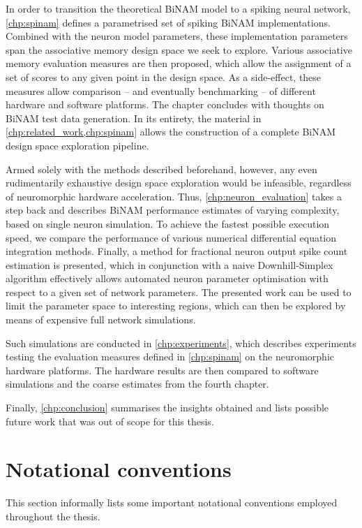 In order to transition the theoretical \acrshort{BiNAM} model to a spiking neural network, \cref{chp:spinam} defines a parametrised set of spiking \acrshort{BiNAM} implementations. Combined with the neuron model parameters, these implementation parameters span the associative memory design space we seek to explore. Various associative memory evaluation measures are then proposed, which allow the assignment of a set of scores to any given point in the design space. As a side-effect, these measures allow comparison -- and eventually benchmarking -- of different hardware and software platforms. The chapter concludes with thoughts on \acrshort{BiNAM} test data generation. In its entirety, the material in \cref{chp:related_work,chp:spinam} allows the construction of a complete \acrshort{BiNAM} design space exploration pipeline.

Armed solely with the methods described beforehand, however, any even rudimentarily exhaustive design space exploration would be infeasible, regardless of neuromorphic hardware acceleration. Thus, \cref{chp:neuron_evaluation} takes a step back and describes \acrshort{BiNAM} performance estimates of varying complexity, based on single neuron simulation. To achieve the fastest possible execution speed, we compare the performance of various numerical differential equation integration methods. Finally, a method for fractional neuron output spike count estimation is presented, which in conjunction with a naive Downhill-Simplex algorithm effectively allows automated neuron parameter optimisation with respect to a given set of network parameters. The presented work can be used to limit the parameter space to interesting regions, which can then be explored by means of expensive full network simulations.

Such simulations are conducted in \cref{chp:experiments}, which describes experiments testing the evaluation measures defined in \cref{chp:spinam} on the neuromorphic hardware platforms. The hardware results are then compared to software simulations and the coarse estimates from the fourth chapter.

Finally, \cref{chp:conclusion} summarises the insights obtained and lists possible future work that was out of scope for this thesis.

\section{Notational conventions}
\label{sec:notation}

This section informally lists some important notational conventions employed throughout the thesis.

